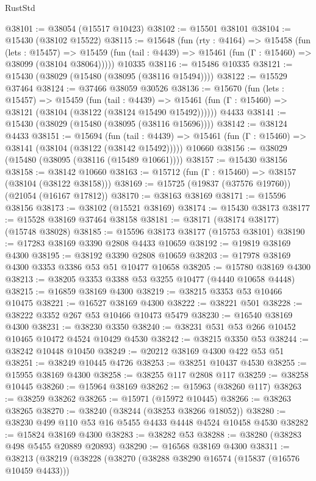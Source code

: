 \begin{lexlean}{RustStd}
\begin{coremodule}
@38101 := @38054 (@15517 @10423)
@38102 := @15501 @38101
@38104 := @15430 (@38102 @15522)
@38115 := @15648
    (fun (rty : @4164) =>
    @15458
      (fun (lets : @15457) =>
      @15459 (fun (tail : @4439) => @15461 (fun (Γ : @15460) => @38099 (@38104 @38064)))))
    @10335
@38116 := @15486 @10335
@38121 := @15430 (@38029 (@15480 (@38095 (@38116 @15494))))
@38122 := @15529 @37464
@38124 := @37466 @38059 @30526
@38136 := @15670
    (fun (lets : @15457) =>
    @15459
      (fun (tail : @4439) =>
      @15461 (fun (Γ : @15460) => @38121 (@38104 (@38122 (@38124 @15490 @15492))))))
    @4433
@38141 := @15430 (@38029 (@15480 (@38095 (@38116 @15696))))
@38142 := @38124 @4433
@38151 := @15694
    (fun (tail : @4439) => @15461 (fun (Γ : @15460) => @38141 (@38104 (@38122 (@38142 @15492)))))
    @10660
@38156 := @38029 (@15480 (@38095 (@38116 (@15489 @10661))))
@38157 := @15430 @38156
@38158 := @38142 @10660
@38163 := @15712 (fun (Γ : @15460) => @38157 (@38104 (@38122 @38158)))
@38169 := @15725 (@19837 (@37576 @19760)) (@21054 (@16167 @17812))
@38170 := @38163 @38169
@38171 := @15596 @38156
@38173 := @38102 (@15521 @38169)
@38174 := @15430 @38173
@38177 := @15528 @38169 @37464 @38158
@38181 := @38171 (@38174 @38177) (@15748 @38028)
@38185 := @15596 @38173 @38177 (@15753 @38101)
@38190 := @17283 @38169 @3390 @2808 @4433 @10659
@38192 := @19819 @38169 @4300
@38195 := @38192 @3390 @2808 @10659
@38203 := @17978 @38169 @4300 @3353 @3386 @53 @51 @10477 @10658
@38205 := @15780 @38169 @4300
@38213 := @38205 @3353 @3388 @53 @3255 @10477 (@4440 @10658 @4448)
@38215 := @16859 @38169 @4300
@38219 := @38215 @3353 @53 @10466 @10475
@38221 := @16527 @38169 @4300
@38222 := @38221 @501
@38228 := @38222 @3352 @267 @53 @10466 @10473 @5479
@38230 := @16540 @38169 @4300
@38231 := @38230 @3350
@38240 := @38231 @531 @53 @266 @10452 @10465 @10472 @4524 @10429 @4530
@38242 := @38215 @3350 @53
@38244 := @38242 @10448 @10450
@38249 := @20212 @38169 @4300 @422 @53 @51
@38251 := @38249 @10445 @4726
@38253 := @38251 @10437 @4530
@38255 := @15955 @38169 @4300
@38258 := @38255 @117 @2808 @117
@38259 := @38258 @10445
@38260 := @15964 @38169
@38262 := @15963 (@38260 @117)
@38263 := @38259 @38262
@38265 := @15971 (@15972 @10445)
@38266 := @38263 @38265
@38270 := @38240 (@38244 (@38253 @38266 @18052))
@38280 := @38230 @499 @110 @53 @16 @5455 @4433 @4448 @4524 @10458 @4530
@38282 := @15824 @38169 @4300
@38283 := @38282 @53
@38288 := @38280 (@38283 @498 @5455 @20889 @20893)
@38290 := @16568 @38169 @4300
@38311 := @38213
    (@38219
      (@38228
        (@38270
          (@38288 @38290 @16574 (@15837 (@16576 @10459 @4433)))

\end{coremodule}
\end{lexlean}
